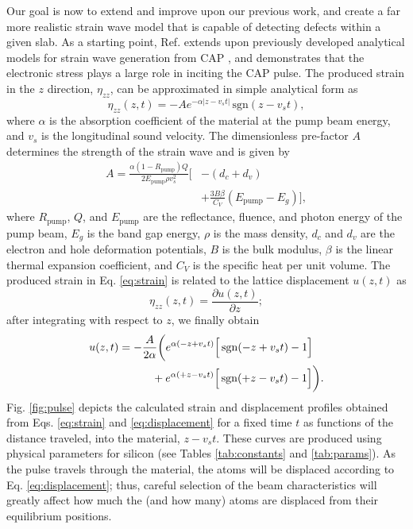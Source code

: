 \documentclass[aps,prb,10pt,showkeys,letterpaper,notitlepage,twocolumn]{revtex4-1}
\begin{document}
Our goal is now to extend and improve upon our previous work, and create a far
more realistic strain wave model that is capable of detecting defects within a
given slab. As a starting point, Ref.  extends upon
previously developed analytical models for strain wave generation from CAP
\cite{thomsenPRB86}, and demonstrates that the electronic stress plays a large
role in inciting the CAP pulse. The produced strain in the $z$ direction,
$\eta_{zz}$, can be approximated in simple analytical form as \cite{wuPRB07}
\begin{equation}\label{eq:strain}
\eta_{zz}(z,t) = -A e^{-\alpha|z - v_{s}t|} \,\mathrm{sgn}(z - v_{s}t),
\end{equation}
where $\alpha$ is the absorption coefficient of the material at the pump beam
energy, and $v_{s}$ is the longitudinal sound velocity. The dimensionless
pre-factor $A$ determines the strength of the strain wave and is given by
\begin{equation}\label{eq:prefactor}
\begin{split}
A = \frac{\alpha(1 - R_{\mathrm{pump}})Q}
         {2E_{\mathrm{pump}}\rho v_{s}^{2}}
\bigg[
&- \left(d_{c} + d_{v}\right)\\
&+ \frac{3B\beta}{C_{V}}\left(E_{\mathrm{pump}} - E_{g}\right)
\bigg],
\end{split}
\end{equation}
where $R_{\mathrm{pump}}$, $Q$, and $E_{\mathrm{pump}}$ are the reflectance,
fluence, and photon energy of the pump beam, $E_{g}$ is the band gap energy,
$\rho$ is the mass density, $d_{c}$ and $d_{v}$ are the electron and hole
deformation potentials, $B$ is the bulk modulus, $\beta$ is the linear thermal
expansion coefficient, and $C_{V}$ is the specific heat per unit volume. The
produced strain in Eq. \eqref{eq:strain} is related to the lattice displacement
$u(z,t)$ as
\begin{equation*}
\eta_{zz}(z,t) = \frac{\partial u(z,t)}{\partial z};
\end{equation*}
after integrating with respect to $z$, we finally obtain
\begin{equation}\label{eq:displacement}
\begin{split}
u(z,t)
&= -\frac{A}{2 \alpha}\bigg(
e^{\alpha (-z + v_{s}t)}
\Big[\,\mathrm{sgn}(-z + v_{s}t) - 1\Big]\\
&\hspace{1.05cm}+
e^{\alpha (+z - v_{s}t)}
\Big[\,\mathrm{sgn}(+z - v_{s}t) - 1\Big]
\bigg).
\end{split}
\end{equation}
Fig. \ref{fig:pulse} depicts the calculated strain and displacement profiles
obtained from Eqs. \eqref{eq:strain} and \eqref{eq:displacement} for a fixed
time $t$ as functions of the distance traveled, into the material, $z-v_{s}t$.
These curves are produced using physical parameters for silicon (see Tables
\ref{tab:constants} and \ref{tab:params}). As the pulse travels through the
material, the atoms will be displaced according to Eq. \eqref{eq:displacement};
thus, careful selection of the beam characteristics will greatly affect how much
the (and how many) atoms are displaced from their equilibrium positions.
\end{document}
